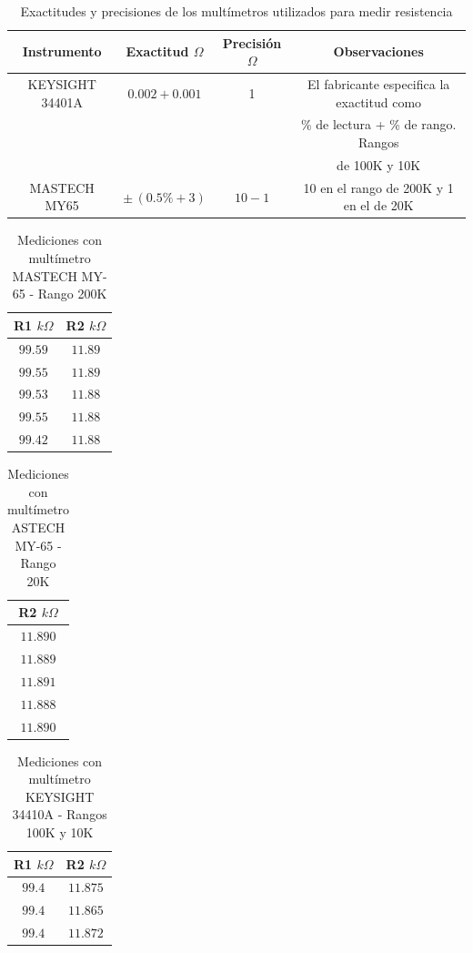 \documentclass[a4paper,11pt,twoside]{IT-CNEA}
\begin{document}
\begin{table}[h!]
\centering
\caption{Exactitudes y precisiones de los multímetros utilizados para medir resistencia }
\label{tabla:multimetros}
\begin{tabular}{|c|c|c|c|}
\hline
Instrumento  & Exactitud $\varOmega$& Precisión $\varOmega$ & Observaciones\\ \hline 
KEYSIGHT 34401A &$0.002+0.001$& 1 &El fabricante especifica la exactitud como \\ 
& & & \% de lectura + \% de rango. Rangos\\ 
& & &de 100K y 10K\\ \hline
MASTECH MY65 & $\pm\,(0.5\%+3)$ & $10-1$ &10 en el rango de 200K y 1 en el de 20K\\ \hline
\end{tabular}
\end{table}
\begin{table}[h!]
\centering
\caption{Mediciones con multímetro MASTECH MY-65 - Rango 200K}
\label{tabla:MASTECH200K}
\begin{tabular}{|c|c|}
\hline
R1 $k \varOmega$&R2 $k \varOmega$\\ \hline
$99.59$&$11.89$ \\ \hline
$99.55$&$11.89$ \\ \hline
$99.53$&$11.88$ \\ \hline
$99.55$&$11.88$ \\ \hline
$99.42$&$11.88$ \\ \hline
\end{tabular}
\end{table}
\begin{table}[h!]
\centering
\caption{Mediciones con multímetro ASTECH MY-65 - Rango 20K}
\label{tabla:MASTECH20K}
\begin{tabular}{|c|}
\hline
R2 $k \varOmega$\\ \hline
$11.890$ \\ \hline
$11.889$ \\ \hline
$11.891$ \\ \hline
$11.888$ \\ \hline
$11.890$ \\ \hline
\end{tabular}
\end{table}
\begin{table}[h!]
\centering
\caption{Mediciones con multímetro KEYSIGHT 34410A - Rangos 100K y 10K}
\label{tabla:KEYSIGHT100K}
\begin{tabular}{|c|c|}
\hline
R1 $k \varOmega$&R2 $k \varOmega$\\ \hline
$99.4$&$11.875$ \\ \hline
$99.4$&$11.865$ \\ \hline
$99.4$&$11.872$ \\ \hline
\end{tabular}
\end{table}
\end{document}
